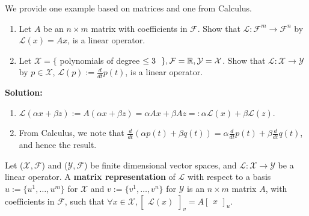 \begin{example}
We provide one example based on matrices and one from Calculus.

    \begin{enumerate}
            \renewcommand{\labelenumi}{(\alph{enumi})}
        \setlength{\itemsep}{.1cm}
        \item Let $A$ be an $n \times m$ matrix with coefficients in $\mathcal{F}$. Show that $\mathcal{L}: \mathcal{F}^m \rightarrow \mathcal{F}^n$ by $\mathcal{L}(x) = A x$, is a linear operator.

        \item Let $\mathcal{X} = \{ $ polynomials of degree $\leq 3~~ \}, \mathcal{F} = \mathbb R, \mathcal{Y} = \mathcal{X}$. Show that $\mathcal{L}: \mathcal{X} \to \mathcal{Y} $ by $p \in \mathcal{X}$, $ \mathcal{L}(p) := \frac{d}{dt} p(t)$, is a linear operator.
    \end{enumerate}
    
        
\end{example}

\textbf{Solution:}

 \begin{enumerate}
            \renewcommand{\labelenumi}{(\alph{enumi})}
        \setlength{\itemsep}{.1cm}
        \item $\mathcal{L}(\alpha x + \beta z) := A(\alpha x + \beta z) = \alpha A x + \beta Az =: \alpha \mathcal{L}(x) + \beta \mathcal{L}(z)$.
        
        \item From Calculus, we note that $\frac{d}{dt}(\alpha  p(t) + \beta q(t)) = \alpha \frac{d}{dt} p(t) + \beta \frac{d}{dt}q(t)$, and hence the result. 
        
          \end{enumerate}

\Qed
\vspace*{.2in}

\begin{definition}
Let ($\mathcal{X}, \mathcal{F}$) and ($\mathcal{Y}, \mathcal{F}$) be finite dimensional vector spaces, and $\mathcal{L}: \mathcal{X} \rightarrow \mathcal{Y}$ be a linear operator. A \textbf{matrix representation} of $\mathcal{L}$ with respect to a basis $u:=\{u^1,  \ldots,u^m\}$ for $\mathcal{X}$ and $v:=\{v^1,  \ldots,v^n\}$ for $\mathcal{Y}$ is an $n \times m$ matrix $A$, with coefficients in $\mathcal{F}$, such that $\forall x \in \mathcal{X}, \begin{bmatrix} \mathcal{L}(x) \end{bmatrix}_v = A \begin{bmatrix} x \end{bmatrix}_u$.

\end{definition}

